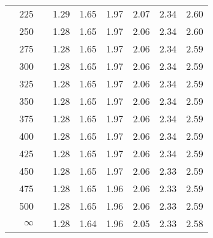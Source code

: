\documentclass[12pt,letterpaper]{article}
\begin{document}
\begin{center}
\begin{tabular}{|l r | l c c c c c c|}
&225&& 1.29 & 1.65 & 1.97 & 2.07 & 2.34 & 2.60\\ 
&250&& 1.28 & 1.65 & 1.97 & 2.06 & 2.34 & 2.60\\ 
&275&& 1.28 & 1.65 & 1.97 & 2.06 & 2.34 & 2.59\\ 
&300&& 1.28 & 1.65 & 1.97 & 2.06 & 2.34 & 2.59\\ 
&325&& 1.28 & 1.65 & 1.97 & 2.06 & 2.34 & 2.59\\ 
&350&& 1.28 & 1.65 & 1.97 & 2.06 & 2.34 & 2.59\\ 
&375&& 1.28 & 1.65 & 1.97 & 2.06 & 2.34 & 2.59\\ 
&400&& 1.28 & 1.65 & 1.97 & 2.06 & 2.34 & 2.59\\ 
&425&& 1.28 & 1.65 & 1.97 & 2.06 & 2.34 & 2.59\\ 
&450&& 1.28 & 1.65 & 1.97 & 2.06 & 2.33 & 2.59\\ 
&475&& 1.28 & 1.65 & 1.96 & 2.06 & 2.33 & 2.59\\ 
&500&& 1.28 & 1.65 & 1.96 & 2.06 & 2.33 & 2.59\\ 
&$\infty$&& 1.28 & 1.64 & 1.96 & 2.05 & 2.33 & 2.58\\ \hline
\end{tabular}
\end{center}






\end{document}
